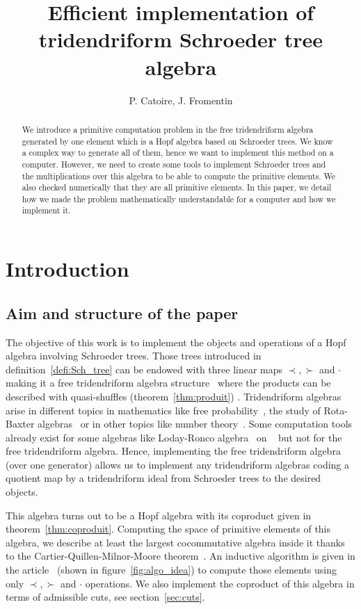 \documentclass[a4paper,10pt]{amsart}
\title{Efficient implementation of tridendriform Schroeder tree algebra}
\author{P. Catoire, J. Fromentin}
\newcommand{\Schw}{Schroeder} %
\theoremstyle{definition}
\begin{document}
\maketitle

\begin{abstract}
	We introduce a primitive computation problem in the free tridendriform algebra generated by one element which is a Hopf algebra based on \Schw{} trees. We know a complex way to generate all of them, hence we want to implement this method on a computer. However, we need to create some tools to implement Schroeder trees and the multiplications over this algebra to be able to compute the primitive elements. We also checked numerically that they are all primitive elements. In this paper, we detail how we made the problem mathematically understandable for a computer and how we implement it. 
\end{abstract}

\section{Introduction}

\subsection{Aim and structure of the paper}

The objective of this work  is to implement the objects and operations of a Hopf algebra involving \Schw{} trees. Those trees introduced in definition~\ref{defi:Sch_tree} can be endowed with three linear maps $\prec, \succ$ and $\cdot$ making it a free tridendriform algebra structure~\cite{LodayRonco_98,Catoire_2023, Manchon_2020} where the products can be described with quasi-shuffles (theorem~\ref{thm:produit}) . 
Tridendriform algebras arise in different topics in mathematics like free probability~\cite{Celestino_2022, Ebrahimi-Fard_Patras_2018}, the study of Rota-Baxter algebras~\cite{Manchon_RB_2020, Gao_2019} or in other topics like number theory~\cite{Ho00, Catoire_2025}.
Some computation tools already exist for some algebras like Loday-Ronco algebra~\cite{Sage_dend} on \Sage{}~\cite{Sage_book,Sage_doc} but not for the free tridendriform algebra. 
Hence, implementing the free tridendriform algebra~\cite{Catoire_2023} (over one generator) allows us to implement any tridendriform algebras coding a quotient map by a tridendriform ideal from \Schw{} trees to the desired objects.

This algebra turns out to be a Hopf algebra with its coproduct given in theorem~\ref{thm:coproduit}. Computing the space of primitive elements of this algebra, we describe at least the largest cocommutative algebra inside it thanks to the Cartier-Quillen-Milnor-Moore theorem~\cite{May_69,MilnorMoore_65, CartierPatras_2021}. An inductive algorithm is given in the article~\cite{Catoire_2023} (shown in figure~\ref{fig:algo_idea}) to compute those elements using only $\prec, \succ$ and $\cdot$ operations. We also implement the coproduct of this algebra in terms of admissible cuts, see section~\ref{sec:cuts}. 
\end{document}
